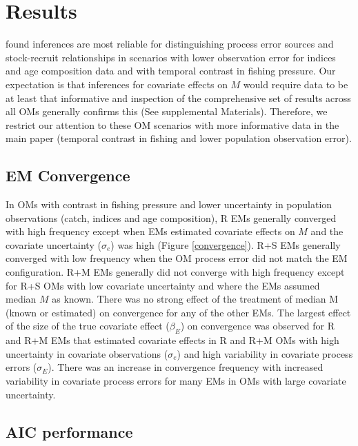 \documentclass[
  12pt,
]{article}
\begin{document}
\hypertarget{results}{%
\section*{Results}\label{results}}

\citet{milleretal_inreview1} found inferences are most reliable for distinguishing process error sources and stock-recruit relationships in scenarios with lower observation error for indices and age composition data and with temporal contrast in fishing pressure. Our expectation is that inferences for covariate effects on \(M\) would require data to be at least that informative and inspection of the comprehensive set of results across all OMs generally confirms this (See supplemental Materials). Therefore, we restrict our attention to these OM scenarios with more informative data in the main paper (temporal contrast in fishing and lower population observation error).

\hypertarget{em-convergence-1}{%
\subsection*{EM Convergence}\label{em-convergence-1}}

In OMs with contrast in fishing pressure and lower uncertainty in population observations (catch, indices and age composition), R EMs generally converged with high frequency except when EMs estimated covariate effects on \(M\) and the covariate uncertainty (\(\sigma_e\)) was high (Figure \ref{convergence}). R+S EMs generally converged with low frequency when the OM process error did not match the EM configuration. R+M EMs generally did not converge with high frequency except for R+S OMs with low covariate uncertainty and where the EMs assumed median \(M\) as known. There was no strong effect of the treatment of median M (known or estimated) on convergence for any of the other EMs. The largest effect of the size of the true covariate effect (\(\beta_E\)) on convergence was observed for R and R+M EMs that estimated covariate effects in R and R+M OMs with high uncertainty in covariate observations (\(\sigma_e\)) and high variability in covariate process errors (\(\sigma_E\)). There was an increase in convergence frequency with increased variability in covariate process errors for many EMs in OMs with large covariate uncertainty.

\hypertarget{aic-performance}{%
\subsection*{AIC performance}\label{aic-performance}}
\end{document}
